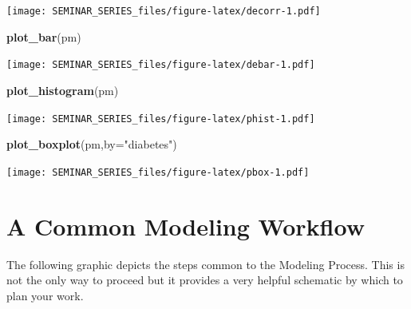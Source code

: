 \documentclass[]{book}
\newenvironment{Shaded}{\begin{snugshade}}{\end{snugshade}}
\newcommand{\KeywordTok}[1]{\textcolor[rgb]{0.13,0.29,0.53}{\textbf{#1}}}
\newcommand{\DataTypeTok}[1]{\textcolor[rgb]{0.13,0.29,0.53}{#1}}
\newcommand{\StringTok}[1]{\textcolor[rgb]{0.31,0.60,0.02}{#1}}
\newcommand{\NormalTok}[1]{#1}
\begin{document}
\texttt{[image: SEMINAR\_SERIES\_files/figure-latex/decorr-1.pdf]}

\begin{Shaded}
\begin{Highlighting}[]
\KeywordTok{plot_bar}\NormalTok{(pm)}
\end{Highlighting}
\end{Shaded}

\texttt{[image: SEMINAR\_SERIES\_files/figure-latex/debar-1.pdf]}

\begin{Shaded}
\begin{Highlighting}[]
\KeywordTok{plot_histogram}\NormalTok{(pm)}
\end{Highlighting}
\end{Shaded}

\texttt{[image: SEMINAR\_SERIES\_files/figure-latex/phist-1.pdf]}

\begin{Shaded}
\begin{Highlighting}[]
\KeywordTok{plot_boxplot}\NormalTok{(pm,}\DataTypeTok{by=}\StringTok{"diabetes"}\NormalTok{)}
\end{Highlighting}
\end{Shaded}

\texttt{[image: SEMINAR\_SERIES\_files/figure-latex/pbox-1.pdf]}

\chapter{A Common Modeling Workflow}\label{a-common-modeling-workflow}

The following graphic depicts the steps common to the Modeling Process.
This is not the only way to proceed but it provides a very helpful
schematic by which to plan your work.
\end{document}
